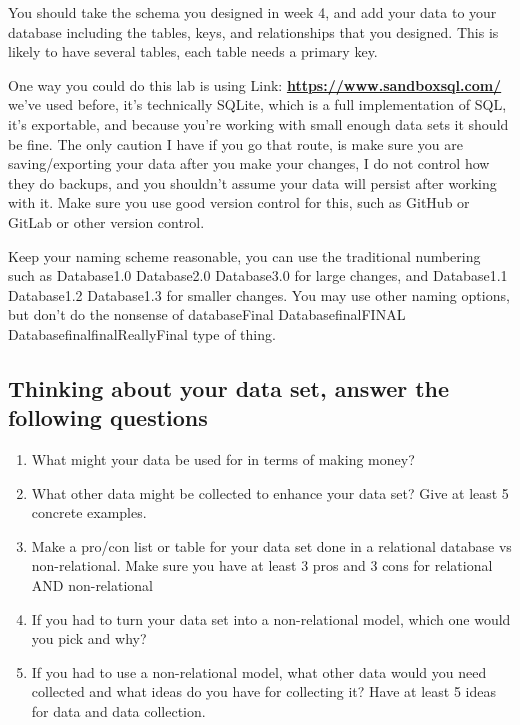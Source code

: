 \documentclass[12pt]{article}
\begin{document}
You should take the schema you designed in week 4, and add your data to your database including the tables, keys, and relationships that you designed.  This is likely to have several tables, each table needs a primary key. 

One way you could do this lab is using Link: \href{https://www.sandboxsql.com/}{\textbf{https://www.sandboxsql.com/}} we've used before, it's technically SQLite, which is a full implementation of SQL, it's exportable, and because you're working with small enough data sets it should be fine.  The only caution I have if you go that route, is make sure you are saving/exporting your data after you make your changes, I do not control how they do backups, and you shouldn't assume your data will persist after working with it.  Make sure you use good version control for this, such as GitHub or GitLab or other version control.  

Keep your naming scheme reasonable, you can use the traditional numbering such as Database1.0 Database2.0 Database3.0 for large changes, and Database1.1  Database1.2 Database1.3 for smaller changes. You may use other naming options, but don't do the nonsense of databaseFinal  DatabasefinalFINAL DatabasefinalfinalReallyFinal type of thing.  

\subsection*{Thinking about your data set, answer the following questions}
    \begin{enumerate}
        \item What might your data be used for in terms of making money?
        \item What other data might be collected to enhance your data set? Give at least 5 concrete examples.
        \item Make a pro/con list or table for your data set done in a relational database vs non-relational.  Make sure you have at least 3 pros and 3 cons for relational AND non-relational
        \item If you had to turn your data set into a non-relational model, which one would you pick and why?
        \item If you had to use a non-relational model, what other data would you need collected and what ideas do you have for collecting it?  Have at least 5 ideas for data and data collection. 
    \end{enumerate}
\end{document}
